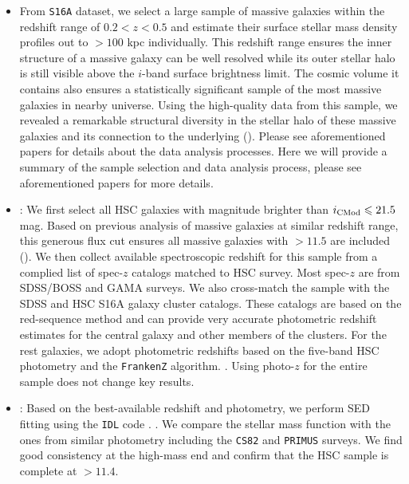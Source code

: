 \documentclass[a4paper,fleqn,usenatbib]{mnras}
\begin{document}
	\begin{itemize}

		\item From \texttt{S16A} dataset, we select a large sample of massive galaxies
			within the redshift range of $0.2 < z < 0.5$ and estimate their surface
			stellar mass density profiles out to $>100$ kpc individually.
			This redshift range ensures the inner structure of a massive galaxy can be
			well resolved while its outer stellar halo is still visible above the $i$-band
			surface brightness limit.
			The cosmic volume it contains also ensures a statistically significant sample
			of the most massive galaxies in nearby universe.
			Using the high-quality data from this sample, we revealed a remarkable structural
			diversity in the stellar halo of these massive galaxies and its connection to
			the underlying \mhalo{} (\addref{}).
			Please see aforementioned papers for details about the data analysis processes.
			Here we will provide a summary of the sample selection and data analysis
			process, please see aforementioned papers for more details.

		\item {}: We first select all HSC galaxies with \cmodel{} magnitude
			brighter than $i_{\rm CMod} \leq 21.5$ mag. Based on previous analysis of massive
			galaxies at similar redshift range, this generous flux cut ensures all massive
			galaxies with \mstar{}$>11.5$ are included (\addref{}).
			We then collect available spectroscopic redshift for this sample from a complied
			list of spec-$z$ catalogs matched to HSC survey.
			Most spec-$z$ are from SDSS/BOSS and GAMA surveys.
			We also cross-match the sample with the SDSS \redm{} and HSC S16A \camira{}
			galaxy cluster catalogs.
			These catalogs are based on the red-sequence method and can provide very accurate
			photometric redshift estimates for the central galaxy and other members of the
			clusters.
			For the rest galaxies, we adopt photometric redshifts based on the five-band
			HSC \cmodel{} photometry and the \texttt{FrankenZ} algorithm. . Using photo-$z$ for the entire sample
			does not change key results.

		\item {}: Based on the best-available redshift and \cmodel{} photometry,
			we perform SED fitting using the \texttt{IDL} code \ised{}.
			.
			We compare the \mcmodel{} stellar mass function with the ones from similar
			photometry including the \texttt{CS82} and \texttt{PRIMUS} surveys.
			We find good consistency at the high-mass end and confirm that the HSC
			sample is complete at \mcmodel{}$>11.4$.

	\end{itemize}
\end{document}
